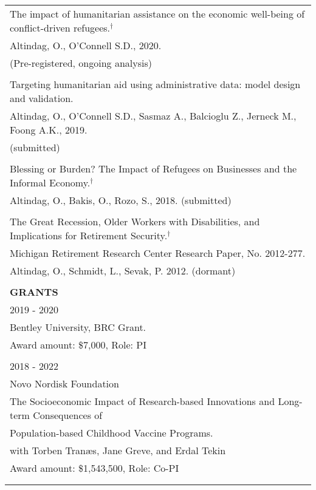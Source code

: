 \documentclass[12 pt]{article}
\begin{document}
\begin{longtable}{ccccc}
 \multicolumn{5}{l}{The impact of humanitarian assistance on the economic well-being of conflict-driven refugees.$^{\dagger}$} \\
 \multicolumn{5}{l}{Altindag, O., O'Connell S.D., 2020.}  \\
  \multicolumn{5}{l}{(Pre-registered, ongoing analysis)}  \\

  \\

\multicolumn{5}{l}{Targeting humanitarian aid using administrative data: model design and validation.} \\ 
  \multicolumn{5}{l}{Altindag, O., O'Connell S.D., Sasmaz A., Balcioglu Z., Jerneck M., Foong A.K., 2019.} \\
\multicolumn{5}{l}{(submitted)} \\ 
 
\\
  \multicolumn{5}{l}{Blessing or Burden? The Impact of Refugees on Businesses and the Informal Economy.$^{\dagger}$} \\

  \multicolumn{5}{l}{Altindag, O., Bakis, O., Rozo, S., 2018. (submitted)} \\
  
\\






\multicolumn{5}{l}{The Great Recession, Older Workers with Disabilities, and Implications for Retirement Security.$^{\dagger}$} \\
\multicolumn{5}{l}{Michigan Retirement Research Center Research Paper, No. 2012-277.} \\
\multicolumn{5}{l}{Altindag, O., Schmidt, L., Sevak, P. 2012. (dormant) } \\
\\


  \multicolumn{5}{l}{\textbf{GRANTS}}\\[2 pt]
 \multicolumn{5}{l}{2019 - 2020} \\  
  \multicolumn{5}{l}{Bentley University, BRC Grant.} \\
\multicolumn{5}{l}{Award amount: \$7,000, Role: PI}  \\
\\  
 \multicolumn{5}{l}{2018 - 2022} \\
 \multicolumn{5}{l}{Novo Nordisk Foundation}  \\
\multicolumn{5}{l}{The Socioeconomic Impact of Research-based Innovations and Long-term Consequences of}  \\
  \multicolumn{5}{l}{Population-based Childhood Vaccine Programs.} \\
  \multicolumn{5}{l}{with Torben Tran{\ae}s, Jane Greve, and Erdal Tekin}  \\
  \multicolumn{5}{l}{Award amount: \$1,543,500, Role: Co-PI  }  \\
  \\
  \\


\end{longtable}
\end{document}
